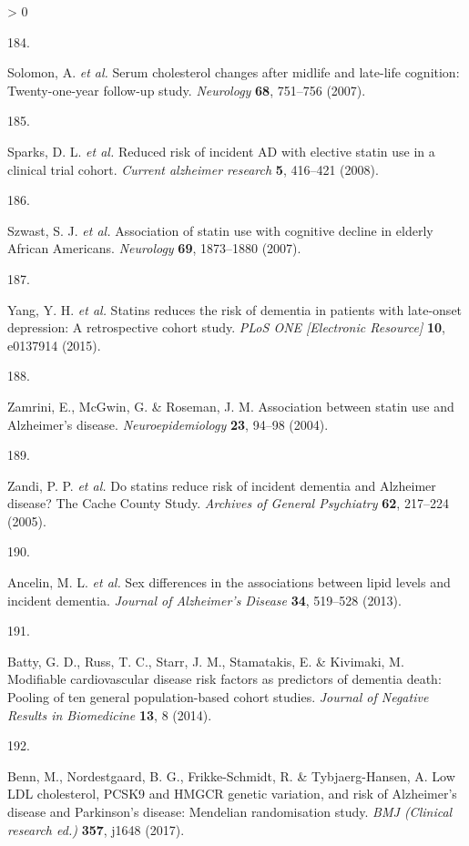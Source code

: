 \documentclass[a4paper, twoside]{templates/ociamthesis}
\newlength{\cslhangindent}
\newlength{\csllabelwidth}
\newenvironment{CSLReferences}[3] %
 {%
  \setlength{\parindent}{0pt}
  \ifodd #1 \everypar{\setlength{\hangindent}{\cslhangindent}}\ignorespaces\fi
  \ifnum #2 > 0
  \setlength{\parskip}{#2\baselineskip}
  \fi
 }%
 {}
\newcommand{\CSLLeftMargin}[1]{\parbox[t]{\maxof{\widthof{#1}}{\csllabelwidth}}{#1}}
\newcommand{\CSLRightInline}[1]{\parbox[t]{\linewidth - \csllabelwidth}{#1}}
\begin{document}
\begin{CSLReferences}{0}{0}
\leavevmode\hypertarget{ref-solomon2007}{}%
\CSLLeftMargin{184. }
\CSLRightInline{Solomon, A. \emph{et al.} Serum cholesterol changes after midlife and late-life cognition: Twenty-one-year follow-up study. \emph{Neurology} \textbf{68}, 751--756 (2007).}

\leavevmode\hypertarget{ref-sparks2008}{}%
\CSLLeftMargin{185. }
\CSLRightInline{Sparks, D. L. \emph{et al.} Reduced risk of incident {AD} with elective statin use in a clinical trial cohort. \emph{Current alzheimer research} \textbf{5}, 416--421 (2008).}

\leavevmode\hypertarget{ref-szwast2007}{}%
\CSLLeftMargin{186. }
\CSLRightInline{Szwast, S. J. \emph{et al.} Association of statin use with cognitive decline in elderly {African Americans}. \emph{Neurology} \textbf{69}, 1873--1880 (2007).}

\leavevmode\hypertarget{ref-yang2015}{}%
\CSLLeftMargin{187. }
\CSLRightInline{Yang, Y. H. \emph{et al.} Statins reduces the risk of dementia in patients with late-onset depression: A retrospective cohort study. \emph{PLoS ONE {[}Electronic Resource{]}} \textbf{10}, e0137914 (2015).}

\leavevmode\hypertarget{ref-zamrini2004}{}%
\CSLLeftMargin{188. }
\CSLRightInline{Zamrini, E., McGwin, G. \& Roseman, J. M. Association between statin use and {Alzheimer}'s disease. \emph{Neuroepidemiology} \textbf{23}, 94--98 (2004).}

\leavevmode\hypertarget{ref-zandi2005}{}%
\CSLLeftMargin{189. }
\CSLRightInline{Zandi, P. P. \emph{et al.} Do statins reduce risk of incident dementia and {Alzheimer} disease? The {Cache County Study}. \emph{Archives of General Psychiatry} \textbf{62}, 217--224 (2005).}

\leavevmode\hypertarget{ref-ancelin2013}{}%
\CSLLeftMargin{190. }
\CSLRightInline{Ancelin, M. L. \emph{et al.} Sex differences in the associations between lipid levels and incident dementia. \emph{Journal of Alzheimer's Disease} \textbf{34}, 519--528 (2013).}

\leavevmode\hypertarget{ref-batty2014}{}%
\CSLLeftMargin{191. }
\CSLRightInline{Batty, G. D., Russ, T. C., Starr, J. M., Stamatakis, E. \& Kivimaki, M. Modifiable cardiovascular disease risk factors as predictors of dementia death: Pooling of ten general population-based cohort studies. \emph{Journal of Negative Results in Biomedicine} \textbf{13}, 8 (2014).}

\leavevmode\hypertarget{ref-benn2017b}{}%
\CSLLeftMargin{192. }
\CSLRightInline{Benn, M., Nordestgaard, B. G., Frikke-Schmidt, R. \& Tybjaerg-Hansen, A. Low {LDL} cholesterol, {PCSK9} and {HMGCR} genetic variation, and risk of {Alzheimer}'s disease and {Parkinson}'s disease: Mendelian randomisation study. \emph{BMJ (Clinical research ed.)} \textbf{357}, j1648 (2017).}


\end{CSLReferences}
\end{document}

